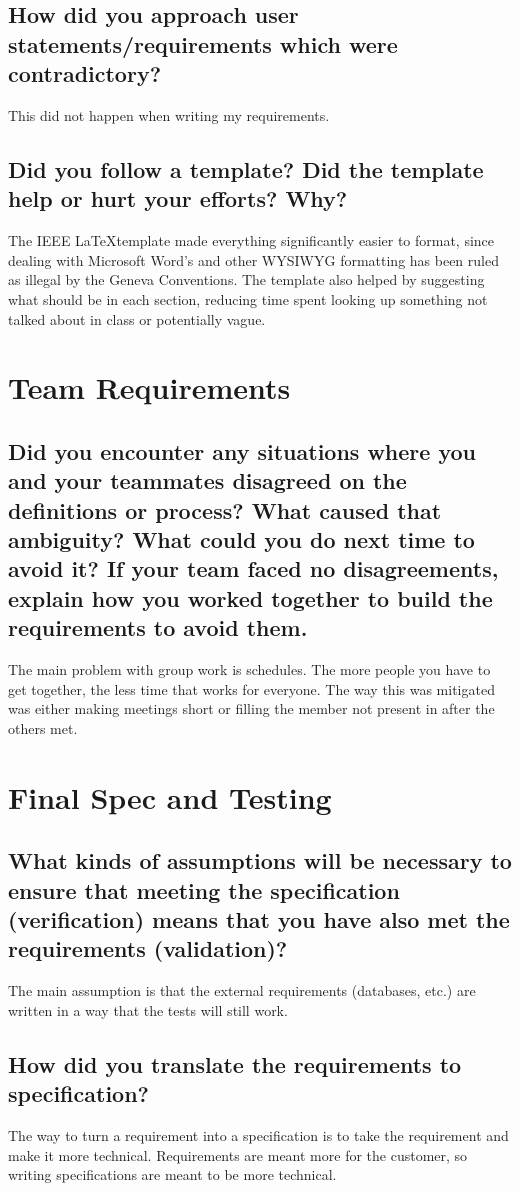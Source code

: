 \documentclass{article}
\begin{document}
    \subsection{How did you approach user statements/requirements which were contradictory?}
 This did not happen when writing my requirements.
    \subsection{Did you follow a template? Did the template help or hurt your efforts? Why?}
The IEEE \LaTeX template made everything significantly easier to format, since dealing with Microsoft Word's and other WYSIWYG formatting has been ruled as illegal by the Geneva Conventions. The template also helped by suggesting what should be in each section, reducing time spent looking up something not talked about in class or potentially vague.

\section{Team Requirements}
    \subsection{Did you encounter any situations where you and your teammates disagreed on the definitions or process? What caused that ambiguity? What could you do next time to avoid it? If your team faced no disagreements, explain how you worked together to build the requirements to avoid them.}
The main problem with group work is schedules. The more people you have to get together, the less time that works for everyone. The way this was mitigated was either making meetings short or filling the member not present in after the others met.

\section{Final Spec and Testing}
    \subsection{What kinds of assumptions will be necessary to ensure that meeting the specification (verification) means that you have also met the requirements (validation)?}
 The main assumption is that the external requirements (databases, etc.) are written in a way that the tests will still work.
    \subsection{How did you translate the requirements to specification?}
 The way to turn a requirement into a specification is to take the requirement and make it more technical. Requirements are meant more for the customer, so writing specifications are meant to be more technical.
\end{document}
